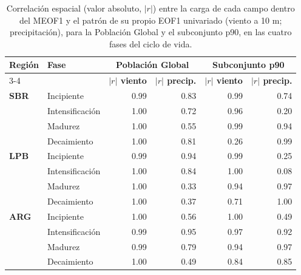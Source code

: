 \begin{table}[htbp]
\centering
\caption[Correlación espacial entre el MEOF1 y los EOF1 univariados (las cuatro fases)]{Correlación espacial (valor absoluto, $|r|$) entre la carga de cada campo dentro del MEOF1 y el patrón de su propio EOF1 univariado (viento a 10 m; precipitación), para la Población Global y el subconjunto p90, en las cuatro fases del ciclo de vida.}
\label{tab:meof_bias_check_completa}
\begin{tabular*}{\textwidth}{@{\extracolsep{\fill}}llrrrr}
\hline
\textbf{Región} & \textbf{Fase} & \multicolumn{2}{c}{\textbf{Población Global}} & \multicolumn{2}{c}{\textbf{Subconjunto p90}} \\
\cline{3-4} \cline{5-6}
 & & \textbf{$|r|$ viento} & \textbf{$|r|$ precip.} & \textbf{$|r|$ viento} & \textbf{$|r|$ precip.} \\
\hline
\textbf{SBR} & Incipiente & 0.99 & 0.83 & 0.99 & 0.74 \\
 & Intensificación & 1.00 & 0.72 & 0.96 & 0.20 \\
 & Madurez & 1.00 & 0.55 & 0.99 & 0.94 \\
 & Decaimiento & 1.00 & 0.81 & 0.26 & 0.99 \\
\hline
\textbf{LPB} & Incipiente & 0.99 & 0.94 & 0.99 & 0.25 \\
 & Intensificación & 1.00 & 0.84 & 1.00 & 0.08 \\
 & Madurez & 1.00 & 0.33 & 0.94 & 0.97 \\
 & Decaimiento & 1.00 & 0.37 & 0.71 & 1.00 \\
\hline
\textbf{ARG} & Incipiente & 1.00 & 0.56 & 1.00 & 0.49 \\
 & Intensificación & 0.99 & 0.95 & 0.97 & 0.92 \\
 & Madurez & 0.99 & 0.79 & 0.94 & 0.97 \\
 & Decaimiento & 1.00 & 0.49 & 0.84 & 0.85 \\
\hline
\end{tabular*}
\end{table}
